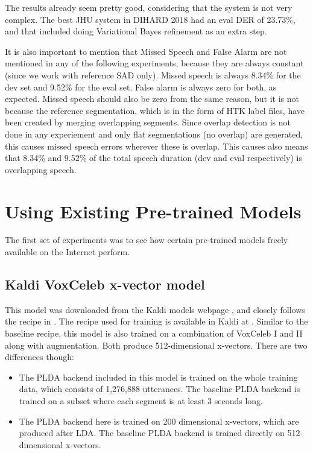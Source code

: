 	The results already seem pretty good, considering that the system is not very complex. The best JHU system in DIHARD 2018 had an eval DER of 23.73\%, and that included doing Variational Bayes refinement as an extra step.

	It is also important to mention that Missed Speech and False Alarm are not mentioned in any of the following experiments, because they are always constant (since we work with reference SAD only). Missed speech is always 8.34\% for the dev set and 9.52\% for the eval set. False alarm is always zero for both, as expected. Missed speech should also be zero from the same reason, but it is not because the reference segmentation, which is in the form of HTK label files, have been created by merging overlapping segments. Since overlap detection is not done in any experiement and only flat segmentations (no overlap) are generated, this causes missed speech errors wherever these is overlap. This causes also means that 8.34\% and 9.52\% of the total speech duration (dev and eval respectively) is overlapping speech.
		
	\section{Using Existing Pre-trained Models}
	The first set of experiments was to see how certain pre-trained models freely available on the Internet perform.
	
		\subsection{Kaldi VoxCeleb x-vector model}
			This model was downloaded from the Kaldi models webpage \cite{kaldi_models_webpage}, and closely follows the recipe in \cite{snyder2018x}. The recipe used for training is available in Kaldi at . Similar to the baseline recipe, this model is also trained on a combination of VoxCeleb I and II along with augmentation. Both produce 512-dimensional x-vectors. There are two differences though:
			\begin{itemize}
				\item The PLDA backend included in this model is trained on the whole training data, which consists of 1,276,888 utterances. The baseline PLDA backend is trained on a subset where each segment is at least 3 seconds long.
				\item The PLDA backend here is trained on 200 dimensional x-vectors, which are produced after LDA. The baseline PLDA backend is trained directly on 512-dimensional x-vectors.
			\end{itemize}
			
